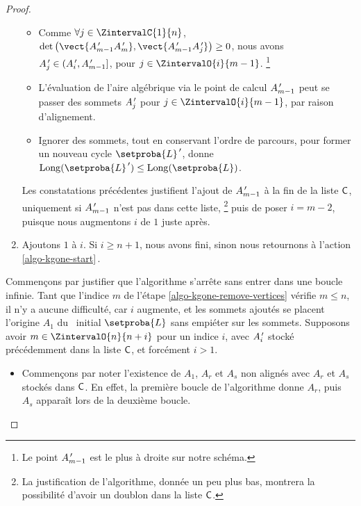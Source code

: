 \begin{proof}
\begin{enumerate}[label=\fbox{\small\bfseries\textsf{A\kern.25pt\arabic*}}]
\begin{itemize}
            \item Comme 
            $\forall j \in \ZintervalC{1}{n}$,
            $\det \big( \vect{\primeit{A}_{m-1} \primeit{A}_m}, \vect{\primeit{A}_{m-1} \primeit{A}_{j}} \big) \geq 0$, 
            nous avons
            $A^{\,\prime}_{j} \in ( A^{\,\prime}_i , A^{\,\prime}_{m-1} ]$,
            pour $j \in \ZintervalO{i}{m-1}$.%
            \footnote{
        	    Le point $A^{\,\prime}_{m-1}$ est le plus à droite sur notre schéma.
            }

            \item L'évaluation de l'aire algébrique via le point de calcul $A^{\,\prime}_{m-1}$ peut se passer des sommets $A^{\,\prime}_j$ pour $j \in \ZintervalO{i}{m-1}$, par raison d'alignement.

            \item Ignorer des sommets, tout en conservant l'ordre de parcours, pour former un nouveau cycle $\setproba{L}^{\,\prime}$, donne $\cyclelen{\setproba{L}^{\,\prime}} \leq \cyclelen{\setproba{L}} $.
        \end{itemize}
        
        \noindent
        Les constatations précédentes justifient l'ajout de
        $A^{\,\prime}_{m-1}$ à la fin de la liste $\mathsf{C}$, uniquement si $A^{\,\prime}_{m-1}$ n'est pas dans cette liste,%
        \footnote{
        	La justification de l'algorithme, donnée un peu plus bas, montrera la possibilité d'avoir un doublon dans la liste $\mathsf{C}$.
        }
        puis de poser $i = m - 2$, puisque nous augmentons $i$ de $1$ juste après.

	
		\item \label{algo-kgone-loop-back}
		Ajoutons $1$ à $i$.
		Si $i \geq n+1$, nous avons fini, sinon nous retournons à l'action \ref{algo-kgone-start}\,.
    \end{enumerate}
    

    \medskip

    
    Commençons par justifier que l'algorithme s'arrête sans entrer dans une boucle infinie.
    Tant que l'indice $m$ de l'étape \ref{algo-kgone-remove-vertices} vérifie $m \leq n$, il n'y a aucune difficulté, car $i$ augmente, et les sommets ajoutés se placent  l'origine $A_1$ du \ncycle\ initial $\setproba{L}$ sans empiéter sur les  sommets. Supposons avoir $m \in \ZintervalO{n}{n+i}$ pour un indice $i$, avec $A^{\,\prime}_i$ stocké précédemment dans la liste $\mathsf{C}$, et forcément $i > 1$.
    \begin{itemize}
        \item Commençons par noter l'existence de $A_1$, $A_r$ et $A_s$ non alignés avec $A_r$ et $A_s$ stockés dans $\mathsf{C}$.
        En effet,
        la première boucle de l'algorithme donne $A_r$, puis $A_s$ apparaît lors de la deuxième boucle.



\end{itemize}
\end{proof}
